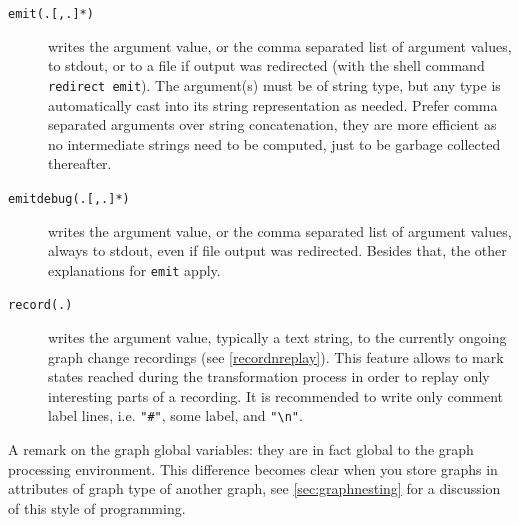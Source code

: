 \begin{description}
\item[\texttt{emit(.[,.]*)}] writes the argument value, or the comma separated list of argument values, to stdout, or to a file if output was redirected (with the shell command \texttt{redirect emit}). The argument(s) must be of string type, but any type is automatically cast into its string representation as needed. Prefer comma separated arguments over string concatenation, they are more efficient as no intermediate strings need to be computed, just to be garbage collected thereafter.
\item[\texttt{emitdebug(.[,.]*)}] writes the argument value, or the comma separated list of argument values, always to stdout, even if file output was redirected. Besides that, the other explanations for \texttt{emit} apply.
\item[\texttt{record(.)}] writes the argument value, typically a text string, to the currently ongoing graph change recordings (see \ref{recordnreplay}).
This feature allows to mark states reached during the transformation process in order to replay only interesting parts of a recording.
It is recommended to write only comment label lines, i.e. \verb/"#"/, some label, and \verb/"\n"/.\end{description}

A remark on the graph global variables: they are in fact global to the graph processing environment.
This difference becomes clear when you store graphs in attributes of graph type of another graph, see \ref{sec:graphnesting} for a discussion of this style of programming.
